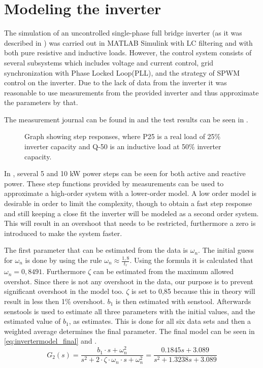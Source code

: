 \section{Modeling the inverter}
\label{invertermodel}

The simulation of an uncontrolled single-phase full bridge inverter (as it was described in ) was carried out in MATLAB Simulink with LC filtering and with both pure resistive and inductive loads. However, the control system consists of several subsystems which includes voltage and current control, grid synchronization with Phase Locked Loop(PLL), and the strategy of SPWM control on the inverter. Due to the lack of data from the inverter it was reasonable to use measurements from the provided inverter and thus approximate the parameters by that. 

The measurement journal can be found in  and the test results can be seen in . 

\begin{figure}[H]
\centering

\caption{Graph showing step responses, where P25 is a real load of 25\% inverter capacity and Q-50 is an inductive load at 50\% inverter capacity.}\label{fig:inverter_data_main}
\end{figure}

In , several 5 and 10 kW power steps can be seen for both active and reactive power. These step functions provided by measurements can be used to approximate a high-order system with a lower-order model. A low order model is desirable in order to limit the complexity, though to obtain a fast step response and still keeping a close fit the inverter will be modeled as a second order system. This will result in an overshoot that needs to be restricted, furthermore a zero is introduced to make the system faster. 
%

The first parameter that can be estimated from the data is $\omega_n$. The initial guess for $\omega_n$ is done by using the rule $\omega_n \approx \frac{1,8}{t_r}$. Using the formula it is calculated that $\omega_n = 0,8491$. Furthermore $\zeta$ can be estimated from the maximum allowed overshot. Since there is not any overshoot in the data, our purpose is to prevent significant overshoot in the model too. $\zeta$ is set to 0,85 because this in theory will result in less then 1\% overshoot. $b_1$ is then estimated with senstool. Afterwards senstools is used to estimate all three parameters with the initial values, and the estimated value of $b_1$, as estimates. This is done for all six data sets and then a weighted average determines the final parameter. The final model can be seen in \eqref{eq:invertermodel_final} and .
%
\begin{equation}
G_2(s) = \frac{b_1 \cdot s + \omega^2_n}{s^2 + 2 \cdot \zeta \cdot \omega_n \cdot s + \omega^2_n} = \frac{0.1845 s + 3.089}{s^2 + 1.3238 s + 3.089}
\label{eq:invertermodel_final}
\end{equation}

